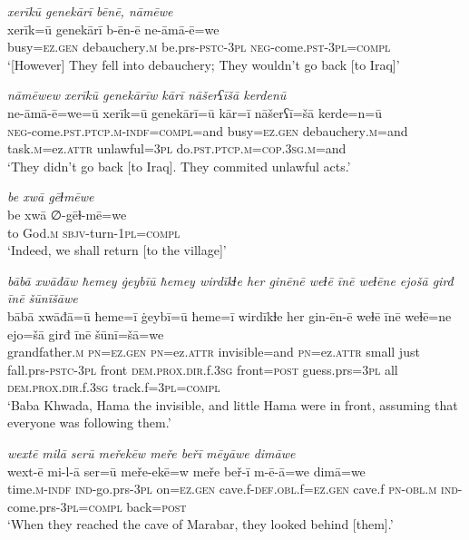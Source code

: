 \ea \label{BP.93}
\textit{xerīkū genekārī bēnē, nāmēwe} \\ 
\gll xerīk=ū genekārī b-ēn-ē ne-āmā-ē=we \\ 
 busy\textsc{=ez.gen} debauchery\textsc{.m} be.prs\textsc{-pstc}\textsc{-3pl} \textsc{neg-}come\textsc{.pst}\textsc{-3pl}\textsc{=compl} \\ 
\glt `[However] They fell into debauchery; They wouldn’t go back [to Iraq]'
\z 
 
\ea \label{BP.94}
\textit{nāmēwew xerīkū genekārīw kārī nāšerʕīšā kerdenū} \\ 
\gll ne-āmā-ē=we=ū xerīk=ū genekārī=ū kār=ī nāšerʕī=šā kerde=n=ū \\ 
 \textsc{neg-}come\textsc{.pst}\textsc{.ptcp}\textsc{.m}\textsc{-indf}\textsc{=compl}=and busy\textsc{=ez.gen} debauchery\textsc{.m}=and task\textsc{.m}=ez.\textsc{attr} unlawful\textsc{=3pl} do\textsc{.pst}\textsc{.ptcp}\textsc{.m}\textsc{=cop}\textsc{.3sg}\textsc{.m}=and \\ 
\glt `They didn’t go back [to Iraq]. They commited unlawful acts.'
\z 
 
\ea \label{BP.103}
\textit{be xwā gēɫmēwe} \\ 
\gll be xwā ∅-gēɫ-mē=we \\ 
 to God\textsc{.m} \textsc{sbjv-}turn\textsc{-\textsc{1pl}}\textsc{=compl} \\ 
\glt `Indeed, we shall return [to the village]'
\z 
 
\ea \label{BP.105}
\textit{bābā xwāđāw ħemey ġeybīū ħemey wirdīkɫe her ginēnē weɫē īnē weɫēne ejošā girđ īnē šūnīšāwe} \\ 
\gll bābā xwāđā=ū ħeme=ī ġeybī=ū ħeme=ī wirdīkɫe her gin-ēn-ē weɫē īnē weɫē=ne ejo=šā girđ īnē šūnī=šā=we \\ 
 grandfather\textsc{.m} \textsc{pn}\textsc{=ez.gen} \textsc{pn}=ez.\textsc{attr} invisible=and \textsc{pn}=ez.\textsc{attr} small just fall.prs\textsc{-pstc}\textsc{-3pl} front \textsc{dem.prox}\textsc{.dir}.f\textsc{.3sg} front\textsc{=\textsc{post}} guess.prs\textsc{=3pl} all \textsc{dem.prox}\textsc{.dir}.f\textsc{.3sg} track.f\textsc{=3pl}\textsc{=compl} \\ 
\glt `Baba Khwada, Hama the invisible, and little Hama were in front, assuming that everyone was following them.'
\z 
 
\ea \label{BP.106}
\textit{wextē milā serū meřekēw meře beřī mēyāwe dimāwe} \\ 
\gll wext-ē mi-l-ā ser=ū meře-ekē=w meře beř-ī m-ē-ā=we dimā=we \\ 
 time\textsc{.m}\textsc{-indf} \textsc{ind-}go.prs\textsc{-3pl} on\textsc{=ez.gen} cave.f\textsc{-def}\textsc{.obl}.f\textsc{=ez.gen} cave.f \textsc{pn}\textsc{-obl}\textsc{.m} \textsc{ind-}come.prs\textsc{-3pl}\textsc{=compl} back\textsc{=\textsc{post}} \\ 
\glt `When they reached the cave of Marabar, they looked behind [them].'
\z 
 
